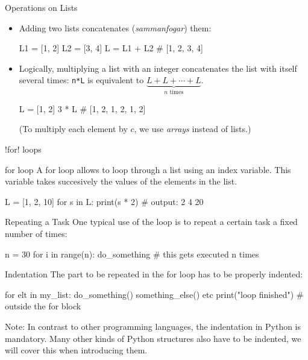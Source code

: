 \documentclass[hyperref={pdfpagelabels=false},table, handout]{beamer}
\begin{document}
\begin{frame}[fragile]{Operations on Lists}
\begin{itemize}[<+->]
\item Adding two lists \alert{concatenates} (\emph{sammanfogar}) them:
\begin{python}
L1 = [1, 2]
L2 = [3, 4]
L = L1 + L2 # [1, 2, 3, 4]
\end{python}
\item Logically, multiplying a list with an integer concatenates the list with
itself several times: \texttt{n*L} is equivalent to $\underbrace{L+L+\cdots+L}_{\text{$n$ times}}$.
\vskip 8pt
\begin{python}
L = [1, 2]
3 * L # [1, 2, 1, 2, 1, 2]
\end{python}
(To multiply each element by $c$, we use \emph{arrays} instead of lists.)
\end{itemize}
\end{frame}



\begin{frame}[fragile]{\pyth!for! loops}
\begin{block}{for loop}
A \alert{for loop} allows to loop through a list using an \alert{index variable}. This variable takes succesively the values of the elements in the list.
\end{block}
\pause
\begin{example}
\begin{python}
L = [1, 2, 10]
for s in L:
  print(s * 2) # output: 2 4 20
\end{python}
\end{example}
\end{frame}

\begin{frame}[fragile]{Repeating a Task}
One \alert{typical use} of the  loop is to repeat a certain task a fixed number of times:
\begin{python}
n = 30
for i in range(n):
  do_something # this gets executed n times
\end{python}
\end{frame}


\begin{frame}[fragile]{Indentation}
The part to be repeated in the for loop has to be properly \alert{indented}:
\begin{python}
for elt in my_list:
  do_something()
  something_else()
  etc
print("loop finished") # outside the for block
\end{python}
\pause
\vfill
\alert{Note:} In contrast to other programming languages, the indentation in Python is \alert{mandatory}.
\vfill
Many other kinds of Python structures also have to be indented, we will cover this when introducing them.
\end{frame}
\end{document}
